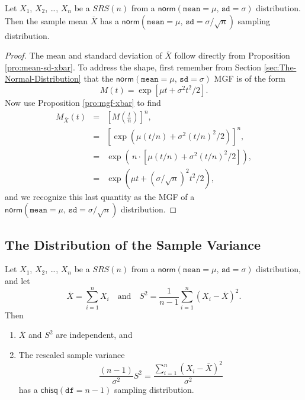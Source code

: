 \documentclass[captions=tableheading]{scrbook}
\begin{document}
\begin{prop}
\label{sub:samp-mean-dist-of}

Let \(X_{1}\), \(X_{2}\), \ldots{}, \(X_{n}\) be a \(SRS(n)\) from a \(\mathsf{norm}(\mathtt{mean}=\mu,\,\mathtt{sd}=\sigma)\) distribution. Then the sample mean \(\overline{X}\) has a \(\mathsf{norm}(\mathtt{mean}=\mu,\,\mathtt{sd}=\sigma/\sqrt{n})\) sampling distribution.
\end{prop}

\begin{proof}
The mean and standard deviation of \(\overline{X}\) follow directly from Proposition \ref{pro:mean-sd-xbar}. To address the shape, first remember from Section \ref{sec:The-Normal-Distribution} that the \(\mathsf{norm}(\mathtt{mean}=\mu,\,\mathtt{sd}=\sigma)\) MGF is of the form
\[
M(t)=\exp\left[ \mu t+\sigma^{2}t^{2}/2\right] .
\]
Now use Proposition \ref{pro:mgf-xbar} to find
\begin{eqnarray*}
M_{\overline{X}}(t) & = & \left[M\left(\frac{t}{n}\right)\right]^{n},\\
 & = & \left[\exp\left( \mu(t/n)+\sigma^{2}(t/n)^{2}/2\right) \right]^{n},\\
 & = & \exp\left( \, n\cdot\left[\mu(t/n)+\sigma^{2}(t/n)^{2}/2\right]\right) ,\\
 & = & \exp\left( \mu t+(\sigma/\sqrt{n})^{2}t^{2}/2\right),
\end{eqnarray*}
and we recognize this last quantity as the MGF of a \(\mathsf{norm}(\mathtt{mean}=\mu,\,\mathtt{sd}=\sigma/\sqrt{n})\) distribution.
\end{proof}
\subsection{The Distribution of the Sample Variance}
\label{sec-8-2-2}

\label{sub:Samp-Var-Dist}

\begin{thm}
\label{thm:Xbar-andS}
Let \(X_{1}\), \(X_{2}\), \ldots{}, \(X_{n}\) be a \(SRS(n)\) from a \(\mathsf{norm}(\mathtt{mean}=\mu,\,\mathtt{sd}=\sigma)\) distribution, and let
\begin{equation}
\overline{X}=\sum_{i=1}^{n}X_{i}\quad\mbox{and}\quad S^{2}=\frac{1}{n-1}\sum_{i=1}^{n}(X_{i}-\overline{X})^{2}.
\end{equation}
Then
\begin{enumerate}
\item \(\overline{X}\) and \(S^{2}\) are independent, and
\item The rescaled sample variance
    \begin{equation}
    \frac{(n-1)}{\sigma^{2}}S^{2}=\frac{\sum_{i=1}^{n}(X_{i}-\overline{X})^{2}}{\sigma^{2}}
    \end{equation}
    has a \(\mathsf{chisq}(\mathtt{df}=n-1)\) sampling distribution.
\end{enumerate}

\end{thm}
\end{document}
